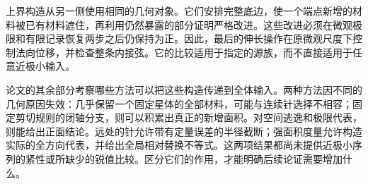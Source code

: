 上界构造从另一侧使用相同的几何对象。它们安排完整底边，使一个端点新增的材料被已有材料遮住，再利用仍然暴露的部分证明严格改进。这些改进必须在微观极限和有限记录恢复两步之后仍保持为正。因此，最后的伸长操作在原微观尺度下控制法向位移，并检查整条内接弦。它的比较适用于指定的源族，而不直接适用于任意近极小输入。

论文的其余部分考察哪些方法可以把这些构造传递到全体输入。两种方法因不同的几何原因失效：几乎保留一个固定星体的全部材料，可能与连续针选择不相容；固定剪切规则的闭轴分支，则可以积累出真正的新增面积。对空间逃逸和极限代表，则能给出正面结论。远处的针允许带有定量误差的半径截断；强面积度量允许构造实际的全方向代表，并给出全局相对替换不等式。这两项结果都尚未提供近极小序列的紧性或所缺少的锐值比较。区分它们的作用，才能明确后续论证需要增加什么。
